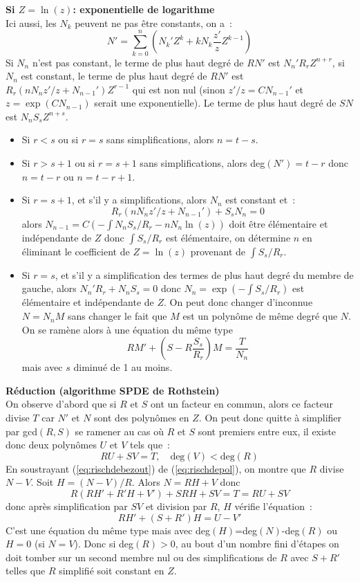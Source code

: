\documentclass[a4paper,11pt]{article}
\begin{document}
{\bf Si $Z=\ln(z)$: exponentielle de logarithme}\\
Ici aussi, les $N_k$ peuvent ne pas être constants, on a~:
\[ N'=\sum_{k=0}^n (N_k'Z^k+kN_k \frac{z'}{z} Z^{k-1})\]
Si $N_n$ n'est pas constant, le terme de plus haut degré de 
$RN'$ est $N_n' R_r Z^{n+r}$, si $N_n$ est constant, 
le terme de plus haut degré de $RN'$ est $R_r(nN_nz'/z+N_{n-1}') Z^{r-1}$ 
qui est non nul (sinon $z'/z=CN_{n-1}'$ et $z=\exp(CN_{n-1})$ serait 
une exponentielle).
Le terme de plus haut degré de $SN$ est $N_n S_s Z^{n+s}$.
\begin{itemize}
\item Si $r<s$ ou si $r=s$ sans simplifications,
alors $n=t-s$.
\item Si $r>s+1$ ou si $r=s+1$ sans simplifications,
alors deg$(N')=t-r$ donc $n=t-r$ ou $n=t-r+1$.
\item Si $r=s+1$, et s'il y a simplifications, alors $N_n$ est constant et~:
\[ R_r(nN_nz'/z+N_{n-1}')+ S_s N_n = 0 \]
alors $N_{n-1}=C (-\int N_n S_s/R_r -n N_n \ln(z))$
doit être élémentaire et indépendante de $Z$ donc $\int S_s/R_r$
est élémentaire, on détermine $n$ en éliminant le coefficient de 
$Z=\ln(z)$ provenant de $\int S_s/R_r$.
\item Si $r=s$, et s'il y a simplification des termes 
de plus haut degré du membre de gauche, 
alors $N_n' R_r+N_n S_s=0$ donc $N_n=\exp(-\int S_s/R_r)$
est élémentaire et indépendante de $Z$. On peut donc changer
d'inconnue $N=N_n M$ sans changer le fait que $M$ est un polynôme de
même degré que $N$. On se ramène alors à une équation du même type
\[ RM'+(S-R \frac{S_s}{R_r})M= \frac{T}{N_n}\]
mais avec $s$ diminué de 1 au moins.
\end{itemize}

{\bf R\'eduction (algorithme SPDE de Rothstein)}\\
On observe d'abord que si $R$ et $S$ ont un facteur
en commun, alors ce facteur divise $T$ car $N'$ et $N$ sont des polyn\^omes
en $Z$. On peut donc quitte \`a simplifier par gcd$(R,S)$ se ramener
au cas o\`u $R$ et $S$ sont premiers entre eux, il existe donc deux
polyn\^omes $U$ et $V$ tels que~:
\begin{equation} \label{eq:rischdebezout}
RU+SV=T, \quad \mbox{deg}(V)< \mbox{deg}(R)
\end{equation}
En soustrayant (\ref{eq:rischdebezout}) de (\ref{eq:rischdepol}), 
on montre que $R$ divise $N-V$. Soit $H=(N-V)/R$. Alors $N=RH+V$ donc
\[ R (RH'+R'H+V')+SRH+SV= T=RU+SV\]
donc apr\`es simplification par $SV$ et division par $R$, 
$H$ v\'erifie l'\'equation~:
\[ R H' + (S+R') H = U - V'\]
C'est une \'equation du m\^eme type mais avec deg$(H)$=deg$(N)$-deg$(R)$
ou $H=0$ (si $N=V$).
Donc si deg$(R)>0$, au bout d'un nombre fini d'\'etapes on doit 
tomber sur un second membre nul ou des simplifications de $R$ avec $S+R'$
telles que $R$ simplifié soit constant en $Z$.
\end{document}
